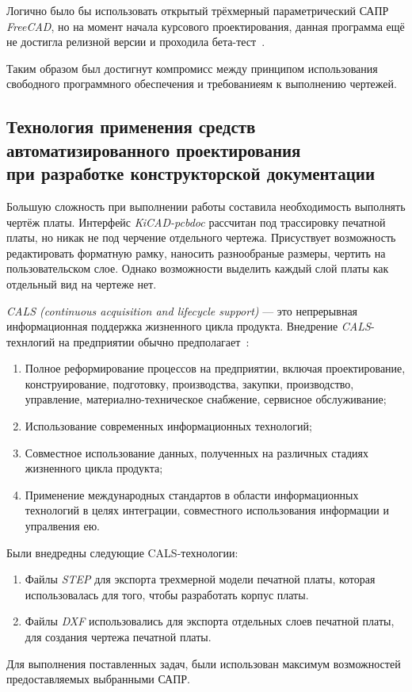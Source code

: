 Логично было бы использовать открытый трёхмерный параметрический
САПР \textit{FreeCAD}, но на момент начала курсового проектирования,
данная программа ещё не достигла релизной версии и
проходила бета-тест~\cite{FreeCAD-Version-1-Released}.

Таким образом был достигнут компромисс между принципом использования
свободного программного обеспечения и требованиеям к выполнению чертежей.

\subsection{Технология применения средств автоматизированного проектирования \\
  при разработке конструкторской документации}

Большую сложность при выполнении работы составила необходимость
выполнять чертёж платы.
Интерфейс \textit{KiCAD-pcbdoc} рассчитан под трассировку печатной
платы, но никак не под черчение отдельного чертежа.
Присуствует возможность редактировать форматную рамку, наносить
разнообраные размеры, чертить на пользовательском слое.
Однако возможности выделить
каждый слой платы как отдельный вид на чертеже нет.

\textit{CALS (continuous acquisition and lifecycle support) } — это
непрерывная информационная поддержка жизненного цикла продукта.
Внедрение \textit{CALS}-технлогий на предприятии обычно
предполагает~\cite{Lanin2019}:
\begin{enumerate}
\item Полное реформирование процессов на предприятии, включая
проектирование, конструирование, подготовку, производства, закупки,
производство, управление, материално-техническое снабжение, сервисное
обслуживание;

\item Использование современных информационных технологий;
  
\item Совместное использование данных, полученных на различных стадиях
  жизненного цикла продукта;
  
\item Применение международных стандартов в области информационных
технологий в целях интеграции, совместного использования информации и
упралвения ею.
\end{enumerate}

Были внедредны следующие CALS-технологии:
\begin{enumerate}
\item Файлы \textit{STEP} для экспорта трехмерной модели печатной
платы, которая использовалась для того, чтобы разработать корпус
платы.

\item Файлы \textit{DXF} использовались для экспорта отдельных слоев
печатной платы, для создания чертежа печатной платы.
\end{enumerate}

Для выполнения поставленных задач, были использован максимум
возможностей предоставляемых выбранными САПР.

\newpage
